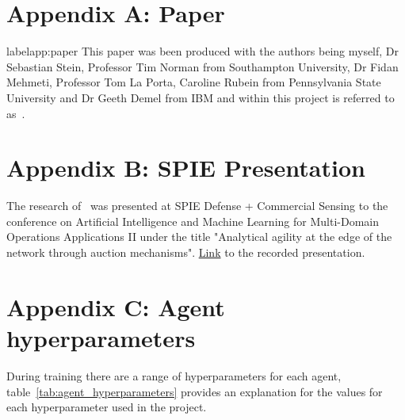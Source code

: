 
\section*{Appendix A: Paper}
label{app:paper}
This paper was been produced with the authors being myself, Dr Sebastian Stein, Professor Tim Norman from Southampton
University, Dr Fidan Mehmeti, Professor Tom La Porta, Caroline Rubein from Pennsylvania State University and Dr Geeth
Demel from IBM and within this project is referred to as~\cite{FlexibleResourceAllocation}.



\section*{Appendix B: SPIE Presentation}
\label{app:spie-presentation}
The research of~\cite{FlexibleResourceAllocation} was presented at SPIE Defense + Commercial Sensing to the conference
on Artificial Intelligence and Machine Learning for Multi-Domain Operations Applications II under the title
"Analytical agility at the edge of the network through auction mechanisms".
\href{https://spie.org/SI/conferencedetails/artificial-intelligence-and-machine-learning-for-multi-domain-battle-applications#2560056}{Link}
to the recorded presentation.



\section*{Appendix C: Agent hyperparameters} \label{app:agent-hyperparameters}
During training there are a range of hyperparameters for each agent, table~\ref{tab:agent_hyperparameters} provides
an explanation for the values for each hyperparameter used in the project.

